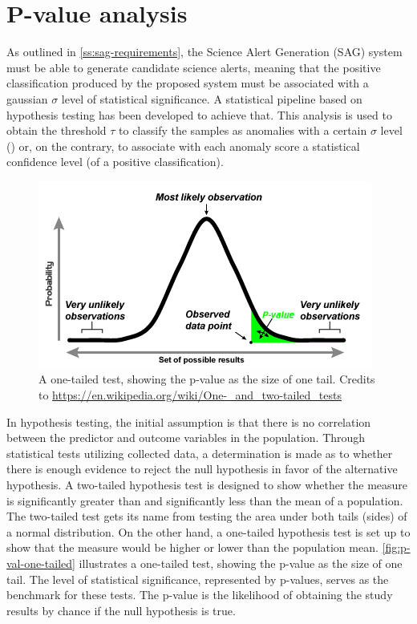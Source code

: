 \section{P-value analysis}
\label{ss:p-values}
As outlined in \autoref{ss:sag-requirements}, the Science Alert Generation (SAG) system must be able to generate candidate science alerts, meaning that the positive classification produced by the proposed system must be associated with a gaussian $\sigma$ level of statistical significance. A statistical pipeline based on hypothesis testing has been developed to achieve that. This analysis is used to obtain the threshold $\tau$ to classify the samples as anomalies with a certain $\sigma$ level (\cite{Parmiggiani_2021}) or, on the contrary, to associate with each anomaly score a statistical confidence level (of a positive classification). 
\begin{figure}[t]
\centering
\includegraphics[width=0.6\linewidth]{figures/method/pvalue.png}
\caption{A one-tailed test, showing the p-value as the size of one tail. Credits to \url{https://en.wikipedia.org/wiki/One-_and_two-tailed_tests}}
\label{fig:p-val-one-tailed}
\end{figure}
In hypothesis testing, the initial assumption is that there is no correlation between the predictor and outcome variables in the population. Through statistical tests utilizing collected data, a determination is made as to whether there is enough evidence to reject the null hypothesis in favor of the alternative hypothesis. A two-tailed hypothesis test is designed to show whether the measure is significantly greater than and significantly less than the mean of a population. The two-tailed test gets its name from testing the area under both tails (sides) of a normal distribution. On the other hand, a one-tailed hypothesis test is set up to show that the measure would be higher or lower than the population mean. \autoref{fig:p-val-one-tailed} illustrates a one-tailed test, showing the p-value as the size of one tail. The level of statistical significance, represented by p-values, serves as the benchmark for these tests. The p-value is the likelihood of obtaining the study results by chance if the null hypothesis is true.
